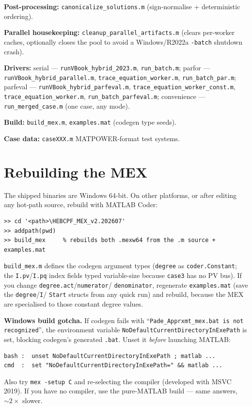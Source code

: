 \documentclass[11pt,a4paper]{article}
\newcommand{\code}[1]{\texttt{#1}}
\begin{document}
\textbf{Post-processing:} \code{canonicalize_solutions.m} (sign-normalise + deterministic
ordering).

\textbf{Parallel housekeeping:} \code{cleanup_parallel_artifacts.m} (clears per-worker
caches, optionally closes the pool to avoid a Windows/R2022a \code{-batch} shutdown
crash).

\textbf{Drivers:}
serial --- \code{runVBook_hybrid_2023.m}, \code{run_batch.m};
parfor --- \code{runVBook_hybrid_parallel.m}, \code{trace_equation_worker.m},
\code{run_batch_par.m};
parfeval --- \code{runVBook_hybrid_parfeval.m}, \code{trace_equation_worker_const.m},
\code{trace_equation_worker.m}, \code{run_batch_parfeval.m};
convenience --- \code{run_merged_case.m} (one case, any mode).

\textbf{Build:} \code{build_mex.m}, \code{examples.mat} (codegen type seeds).

\textbf{Case data:} \code{caseXXX.m} MATPOWER-format test systems.

\section{Rebuilding the MEX}\label{sec:mex}

The shipped binaries are Windows 64-bit. On other platforms, or after editing any
hot-path source, rebuild with MATLAB Coder:
\begin{lstlisting}[style=mat]
>> cd '<path>\HEBCPF_MEX_v2.202607'
>> addpath(pwd)
>> build_mex     % rebuilds both .mexw64 from the .m source + examples.mat
\end{lstlisting}
\code{build_mex.m} defines the codegen argument types (\code{degree} as
\code{coder.Constant}; the \code{I.pv}/\code{I.pq} index fields typed variable-size
because \code{case3} has no PV bus). If you change \code{degree.act}/\code{numerator}/%
\code{denominator}, regenerate \code{examples.mat} (save the \code{degree}/\code{I}/%
\code{Start} structs from any quick run) and rebuild, because the MEX are specialised to
those constant degree values.

\textbf{Windows build gotcha.} If codegen fails with
``\code{Pade_Apprxmt_mex.bat is not recognized}'', the environment variable
\code{NoDefaultCurrentDirectoryInExePath} is set, blocking codegen's generated \code{.bat}.
Unset it \emph{before} launching MATLAB:
\begin{lstlisting}[style=sh]
bash :  unset NoDefaultCurrentDirectoryInExePath ; matlab ...
cmd  :  set "NoDefaultCurrentDirectoryInExePath=" && matlab ...
\end{lstlisting}
Also try \code{mex -setup C} and re-selecting the compiler (developed with MSVC 2019). If
you have no compiler, use the pure-MATLAB build --- same answers, $\sim 2\times$ slower.
\end{document}
